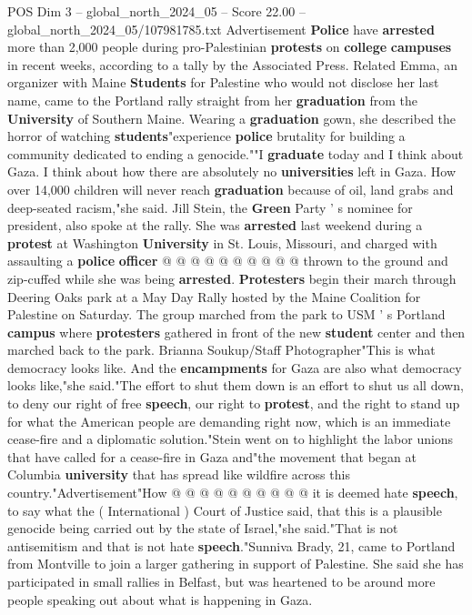 \begin{textsample}{POS Dim 3 – global\_north\_2024\_05 – Score 22.00 – global\_north\_2024\_05/107981785.txt}
Advertisement \textbf{Police} have \textbf{arrested} more than 2,000 people during pro-Palestinian \textbf{protests} on \textbf{college} \textbf{campuses} in recent weeks, according to a tally by the Associated Press.
Related Emma, an organizer with Maine \textbf{Students} for Palestine who would not disclose her last name, came to the Portland rally straight from her \textbf{graduation} from the \textbf{University} of Southern Maine.
Wearing a \textbf{graduation} gown, she described the horror of watching \textbf{students}"experience \textbf{police} brutality for building a community dedicated to ending a genocide.""I \textbf{graduate} today and I think about Gaza.
I think about how there are absolutely no \textbf{universities} left in Gaza.
How over 14,000 children will never reach \textbf{graduation} because of oil, land grabs and deep-seated racism,"she said.
Jill Stein, the \textbf{Green} Party ' s nominee for president, also spoke at the rally.
She was \textbf{arrested} last weekend during a \textbf{protest} at Washington \textbf{University} in St.
Louis, Missouri, and charged with assaulting a \textbf{police} \textbf{officer} @ @ @ @ @ @ @ @ @ @ thrown to the ground and zip-cuffed while she was being \textbf{arrested}. \textbf{Protesters} begin their march through Deering Oaks park at a May Day Rally hosted by the Maine Coalition for Palestine on Saturday.
The group marched from the park to USM ' s Portland \textbf{campus} where \textbf{protesters} gathered in front of the new \textbf{student} center and then marched back to the park.
Brianna Soukup/Staff Photographer"This is what democracy looks like.
And the \textbf{encampments} for Gaza are also what democracy looks like,"she said."The effort to shut them down is an effort to shut us all down, to deny our right of free \textbf{speech}, our right to \textbf{protest}, and the right to stand up for what the American people are demanding right now, which is an immediate cease-fire and a diplomatic solution."Stein went on to highlight the labor unions that have called for a cease-fire in Gaza and"the movement that began at Columbia \textbf{university} that has spread like wildfire across this country."Advertisement"How @ @ @ @ @ @ @ @ @ @ it is deemed hate \textbf{speech}, to say what the ( International ) Court of Justice said, that this is a plausible genocide being carried out by the state of Israel,"she said."That is not antisemitism and that is not hate \textbf{speech}."Sunniva Brady, 21, came to Portland from Montville to join a larger gathering in support of Palestine.
She said she has participated in small rallies in Belfast, but was heartened to be around more people speaking out about what is happening in Gaza.

\end{textsample}
